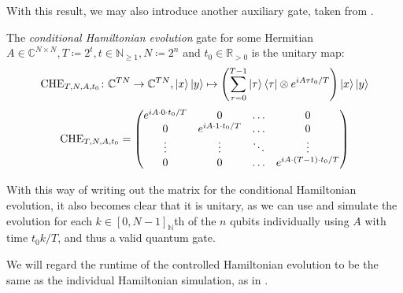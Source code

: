 \phantom{}

With this result, we may also introduce another auxiliary gate, taken from \cite[pp. 3-4]{Harrow2008}.

\begin{definition} \label{conditional_hamiltonian_evolution}
    The \emph{conditional Hamiltonian evolution} gate for some Hermitian \(A \in \mathbb{C}^{N \times N}, T \coloneqq 2^t, t \in \mathbb{N}_{\geq 1}, N \coloneqq 2^n\) and \(t_0 \in \mathbb{R}_{> 0}\) is the unitary map:
    \begin{align}
        \operatorname{CHE}_{T, N, A, t_0}\colon \mathbb{C}^{TN} \to \mathbb{C}^{TN}, \ket{x}\ket{y} \mapsto \left(\sum_{\tau = 0}^{T-1}\ket{\tau}\bra{\tau} \otimes e^{iA \tau t_0/T}\right) \ket{x}\ket{y}
    \end{align}
    \begin{align}
        \operatorname{CHE}_{T, N, A, t_0} = \begin{pmatrix}
            e^{iA \cdot 0 \cdot t_0/T} & 0 & \hdots & 0\\
            0 & e^{iA \cdot 1 \cdot t_0/T} & \hdots & 0\\
            \vdots & \vdots & \ddots & \vdots\\
            0 & 0 & \hdots & e^{iA \cdot (T-1) \cdot t_0/T}
        \end{pmatrix}
    \end{align}
\end{definition}

With this way of writing out the matrix for the conditional Hamiltonian evolution, it also becomes clear that it is unitary, as we can use  and simulate the evolution for each \(k \in [0, N-1]_{\mathbb{N}}\)th of the \(n\) qubits individually using \(A\) with time \(t_0 k/T\), and thus a valid quantum gate.

\begin{remark}
    We will regard the runtime of the controlled Hamiltonian evolution to be the same as the individual Hamiltonian simulation, as in .
\end{remark}
